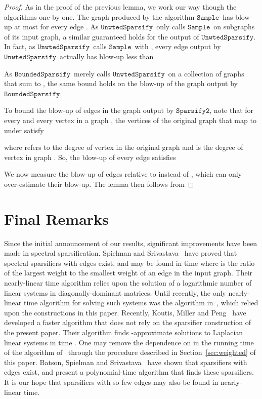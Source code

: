 \documentclass[11pt]{article}
\newcommand{\sparsifytwo}{\ensuremath{\mathtt{Sparsify2}}}
\newcommand{\unwtedsparsify}{\ensuremath{\mathtt{UnwtedSparsify}}}
\newcommand{\boundedsparsify}{\ensuremath{\mathtt{BoundedSparsify}}}
\newcommand{\sample}{\ensuremath{\mathtt{Sample}}}
\begin{document}
\begin{proof}
As in the proof of the previous lemma, we work our way though the algorithms
  one-by-one.
The graph produced by the  algorithm \sample \
  has blow-up at most 
  for every edge .
As \unwtedsparsify \ only calls \sample \ on subgraphs of its input graph,
  a similar guaranteed holds for the output of \unwtedsparsify.
In fact, as \unwtedsparsify \ calls \sample \ with ,
  every edge output by \unwtedsparsify \ actually has blow-up less than

As \boundedsparsify \ merely calls \unwtedsparsify \ on a collection of
  graphs that sum to , the same bound holds on the blow-up of the
  graph output by \boundedsparsify  .

To bound the blow-up of edges in the graph output by \sparsifytwo  ,
  note that for every  and every vertex  in a graph ,
  the vertices  of the original graph that map to  under
   satisfy

where  refers to the degree of vertex  in the original graph
  and  is the degree of vertex  in graph .
So, the blow-up of every edge  satisfies


We now measure the blow-up of edges relative to  instead of
  , which can only over-estimate their blow-up.
The lemma then follows from


\end{proof}

\section{Final Remarks}\label{sec:conclusion}

Since the initial announcement \cite{SpielmanTengPrecon} 
  of our results, significant improvements 
  have been made in spectral sparsification. 
Spielman and Srivastava~\cite{SpielmanSrivastava} have
  proved that spectral sparsifiers with  edges
  exist, and may be found in time  where
   is the ratio of the largest weight to the smallest 
  weight of an edge in the input graph.
Their nearly-linear time algorithm relies upon the solution of a logarithmic
  number of linear systems in diagonally-dominant matrices.
Until recently, the only nearly-linear time algorithm for solving such systems
  was the algorithm in~\cite{SpielmanTengLinsolve}, which relied upon the constructions
  in this paper.
Recently, Koutis, Miller and Peng~\cite{KMP} have developed a faster
  algorithm that does not rely on the sparsifier construction of the present paper.
Their algorithm finds -approximate solutions to Laplacian linear systems
  in time .
One may remove the dependence on  in the running time of the
  algorithm of~\cite{SpielmanSrivastava} through the procedure
  described in Section~\ref{sec:weighted} of this paper.
Batson, Spielman and Srivastava~\cite{BatsonSpielmanSrivastava}
  have shown that sparsifiers with  edges exist, and
  present a polynomial-time algorithm that finds these sparsifiers.
It is our hope that sparsifiers with so few edges may also be found
  in nearly-linear time.
\end{document}
